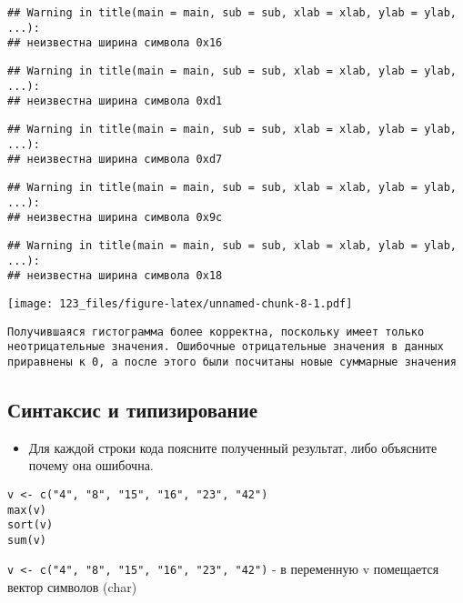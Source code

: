 \documentclass[]{article}
\providecommand{\tightlist}{%
  \setlength{\itemsep}{0pt}\setlength{\parskip}{0pt}}
\begin{document}
\begin{verbatim}
## Warning in title(main = main, sub = sub, xlab = xlab, ylab = ylab, ...):
## неизвестна ширина символа 0x16
\end{verbatim}

\begin{verbatim}
## Warning in title(main = main, sub = sub, xlab = xlab, ylab = ylab, ...):
## неизвестна ширина символа 0xd1
\end{verbatim}

\begin{verbatim}
## Warning in title(main = main, sub = sub, xlab = xlab, ylab = ylab, ...):
## неизвестна ширина символа 0xd7
\end{verbatim}

\begin{verbatim}
## Warning in title(main = main, sub = sub, xlab = xlab, ylab = ylab, ...):
## неизвестна ширина символа 0x9c
\end{verbatim}

\begin{verbatim}
## Warning in title(main = main, sub = sub, xlab = xlab, ylab = ylab, ...):
## неизвестна ширина символа 0x18
\end{verbatim}

\texttt{[image: 123\_files/figure-latex/unnamed-chunk-8-1.pdf]}

\begin{verbatim}
Получившаяся гистограмма более корректна, поскольку имеет только неотрицательные значения. Ошибочные отрицательные значения в данных приравнены к 0, а после этого были посчитаны новые суммарные значения
\end{verbatim}

\subsection{Синтаксис и типизирование}\label{--}

\begin{itemize}
\tightlist
\item
  Для каждой строки кода поясните полученный результат, либо объясните
  почему она ошибочна.
\end{itemize}

\begin{verbatim}
v <- c("4", "8", "15", "16", "23", "42")
max(v)
sort(v)
sum(v)
\end{verbatim}

\texttt{v\ \textless{}-\ c("4",\ "8",\ "15",\ "16",\ "23",\ "42")} - в
переменную v помещается вектор символов (char)
\end{document}
